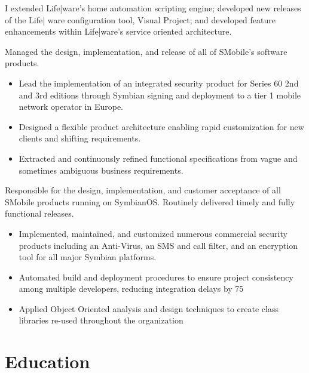 \documentclass[12pt,letter,sans]{moderncv}
\begin{document}

I extended Life|ware's home automation scripting engine; developed new releases
of the Life| ware configuration tool, Visual Project; and developed feature
enhancements within Life|ware's service oriented architecture.

{}{}

Managed the design, implementation, and release of all of SMobile’s software
products.

\begin{itemize}

    \item Lead the implementation of an integrated security product for Series
        60 2nd and 3rd editions through Symbian signing and deployment to a tier
        1 mobile network operator in Europe.
    \item Designed a flexible product architecture enabling rapid customization
        for new clients and shifting requirements.
    \item Extracted and continuously refined functional specifications from vague
        and sometimes ambiguous business requirements.
\end{itemize}


Responsible for the design, implementation, and customer acceptance of all
SMobile products running on SymbianOS.  Routinely delivered timely and fully
functional releases.

\begin{itemize}
    \item
        Implemented, maintained, and customized numerous commercial security products
        including an Anti-Virus, an SMS and call filter, and an encryption tool
        for all major Symbian platforms.
    \item
        Automated build and deployment procedures to ensure project consistency
        among multiple developers, reducing integration delays by 75%
    \item

        Applied Object Oriented analysis and design techniques to create class
        libraries re-used throughout the organization
\end{itemize}

\section{Education}

\end{document}
